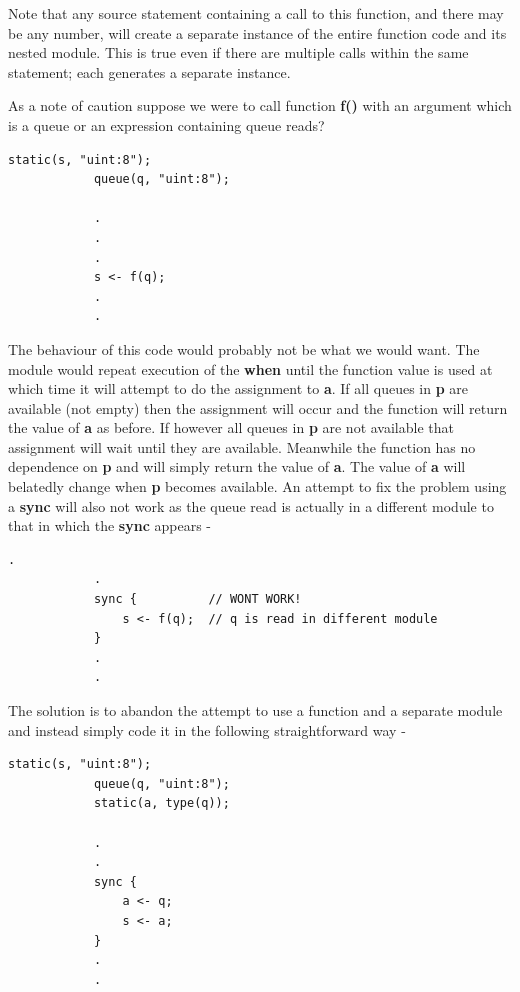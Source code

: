         Note that any source statement containing a call to this function, and
        there may be any number, will create a separate instance of the entire
        function code and its nested module. This is true even if there are
        multiple calls within the same statement; each generates a separate
        instance.
        
        As a note of caution suppose we were to call function {\bf f()} with an
        argument which is a queue or an expression containing queue reads?
        
        \begin{lstlisting}[gobble=8, language=threepl]
            static(s, "uint:8");
            queue(q, "uint:8");
            
            .
            .
            .
            s <- f(q);
            .
            .
        \end{lstlisting}        
        
        The behaviour of this code would probably not be what we would want. The
        module would repeat execution of the {\bf when} until the function value
        is used at which time it will attempt to do the assignment to {\bf a}. If
        all queues in {\bf p} are available (not empty) then the assignment will
        occur and the function will return the value of {\bf a} as before. If
        however all queues in {\bf p} are not available that assignment will wait
        until they are available. Meanwhile the function has no dependence on {\bf
        p} and will simply return the value of {\bf a}. The value of {\bf a} will
        belatedly change when {\bf p} becomes available. An attempt to fix the
        problem using a {\bf sync} will also not work as the queue read is
        actually in a different module to that in which the {\bf sync} appears -
        
        \begin{lstlisting}[gobble=8, language=threepl]
            .
            .
            sync {          // WONT WORK!
                s <- f(q);  // q is read in different module
            }
            .
            .
        \end{lstlisting}
        
        The solution is to abandon the attempt to use a function and a separate
        module and instead simply code it in the following straightforward way -        
        
        \begin{lstlisting}[gobble=8, language=threepl]
            static(s, "uint:8");
            queue(q, "uint:8");
            static(a, type(q));
            
            .
            .
            sync {
                a <- q;
                s <- a;
            }
            .
            .
        \end{lstlisting}
        
